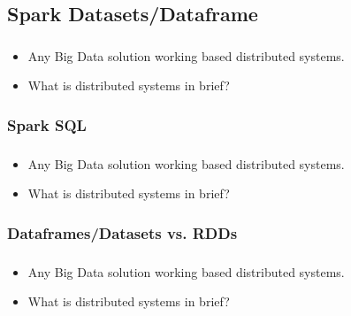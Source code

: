 \subsection{Spark Datasets/Dataframe}


\begin{frame}
  \frametitle{\subsecname}
	\begin{itemize}[<+->]
		\item Any Big Data solution working based distributed systems.
		\item What is distributed systems in brief?
	\end{itemize}
\end{frame}



\subsubsection{Spark SQL}
\begin{frame}
  \frametitle{\subsecname}
	\begin{itemize}[<+->]
		\item Any Big Data solution working based distributed systems.
		\item What is distributed systems in brief?
	\end{itemize}
\end{frame}


\subsubsection{Dataframes/Datasets vs. RDDs}

\begin{frame}
  \frametitle{\subsecname}
	\begin{itemize}[<+->]
		\item Any Big Data solution working based distributed systems.
		\item What is distributed systems in brief?
	\end{itemize}
\end{frame}

